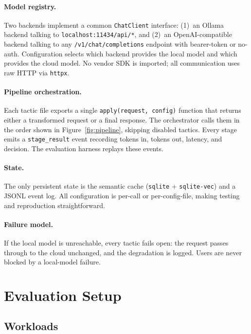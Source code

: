 \documentclass[11pt,a4paper]{article}
\begin{document}
\paragraph{Model registry.}
Two backends implement a common \texttt{ChatClient} interface:
(1)~an Ollama backend talking to \texttt{localhost:11434/api/*}, and
(2)~an OpenAI-compatible backend talking to any
\texttt{/v1/chat/completions} endpoint with bearer-token or no-auth.
Configuration selects which backend provides the local model and which
provides the cloud model. No vendor SDK is imported; all communication
uses raw HTTP via \texttt{httpx}.

\paragraph{Pipeline orchestration.}
Each tactic file exports a single \texttt{apply(request, config)}
function that returns either a transformed request or a final response.
The orchestrator calls them in the order shown in
Figure~\ref{fig:pipeline}, skipping disabled tactics. Every stage emits
a \texttt{stage\_result} event recording tokens in, tokens out, latency,
and decision. The evaluation harness replays these events.

\paragraph{State.}
The only persistent state is the semantic cache
(\texttt{sqlite} + \texttt{sqlite-vec}) and a JSONL event log. All
configuration is per-call or per-config-file, making testing and
reproduction straightforward.

\paragraph{Failure model.}
If the local model is unreachable, every tactic fails open: the request
passes through to the cloud unchanged, and the degradation is logged.
Users are never blocked by a local-model failure.

\section{Evaluation Setup}
\label{sec:eval}

\subsection{Workloads}
\label{sec:workloads}
\end{document}
